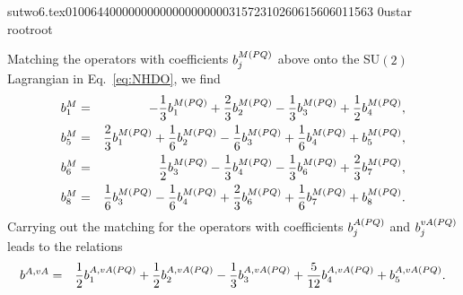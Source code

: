                                                                                                                                                                                                                                                                                       sutwo6.tex                                                                                          0100644 0000000 0000000 00000315723 10260615606 011563  0                                                                                                    ustar   root                            root                                                                                                                                                                                                                   \documentclass[prd,amssymb,amsmath,showpacs,nofootinbib,superscriptaddress]{revtex4}
\begin{document}
%
%
%
%
Matching the operators with coefficients $b_j^{M(PQ)}$ above onto the SU$(2)$ Lagrangian in Eq.~\eqref{eq:NHDO}, 
we find
\begin{eqnarray}\label{eq:bmatch1}
b_1^M &=& -\frac{1}{3} b_1^{M (PQ)} + \frac{2}{3} b_2^{M (PQ)} - \frac{1}{3} b_3^{M (PQ)} + \frac{1}{2} b_4^{M (PQ)}, \\
b_5^M &=&  \frac{2}{3} b_1^{M (PQ)} + \frac{1}{6} b_2^{M (PQ)} - \frac{1}{6} b_3^{M (PQ)} + \frac{1}{6} b_4^{M (PQ)} 
+ b_5^{M (PQ)}, \\
b_6^M &=&  \frac{1}{2} b_3^{M (PQ)} - \frac{1}{3} b_4^{M (PQ)} - \frac{1}{3} b_6^{M (PQ)} + \frac{2}{3} b_7^{M (PQ)}, \\
b_8^M &=&  \frac{1}{6} b_3^{M (PQ)} - \frac{1}{6} b_4^{M (PQ)} + \frac{2}{3} b_6^{M (PQ)} + \frac{1}{6} b_7^{M (PQ)} 
+ b_8^{M (PQ)} 
.\end{eqnarray}
Carrying out the matching for the operators with coefficients $b_j^{A (PQ)}$ and $b_j^{vA (PQ)}$ leads to 
the relations
\begin{eqnarray}
	b^{A,vA} &=& \frac{1}{2} b_1^{A,vA (PQ)} 
		+ \frac{1}{2} b_2^{A,vA (PQ)} 
		- \frac{1}{3} b_3^{A,vA (PQ)} 
		+ \frac{5}{12} b_4^{A,vA (PQ)} 
		+ b_5^{A,vA (PQ)}.
\label{eq:bmatch2}
\end{eqnarray}
\end{document}
